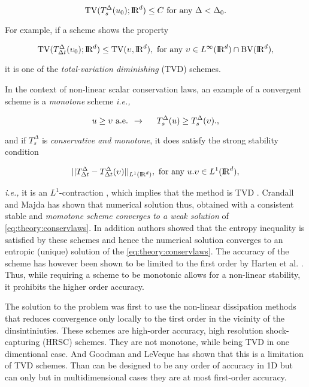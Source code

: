 \begin{equation}
\text{TV}(T_s ^{\Delta}(u_0); \text{I\!R}^d)\leq C \text{ for any } \Delta < \Delta_0.
\end{equation}

For example, if a scheme shows the property 

\begin{equation}
\text{TV}(T_{\Delta t} ^{\Delta}(\upsilon_0); \text{I\!R}^d) \leq \text{TV}(\upsilon,  \text{I\!R}^d), \text{ for any } \upsilon\in L^{\infty}(\text{I\!R}^d)\cap \text{BV}(\text{I\!R}^d),
\end{equation}

it is one of the \textit{total-variation diminishing} (TVD) schemes. 

In the context of non-linear scalar conservation laws, an example of a convergent scheme is a \textit{monotone} scheme \textit{i.e.,}

\begin{equation}
u \geq \upsilon \text{ a.e. } \rightarrow \hspace{5mm} T_{s}^{\Delta}(u) \geq T_{s}^{\Delta}(\upsilon).,
\end{equation}

and if $T_{s}^{\Delta}$ is \textit{conservative and monotone}, it does satisfy the strong stability condition 

\begin{equation}
|| T^{\Delta} _{\Delta t} - T^{\Delta} _{\Delta t}(\upsilon)||_{L^1(\text{I\!R}^d)}, \text{  for any  } u.\upsilon\in L^1(\text{I\!R}^d),
\end{equation}

\textit{i.e.,} it is an $L^1$-contraction \cite{Crandall:1980proc}, which implies that the method is TVD \cite{LeVeque:1992}. 
Crandall and Majda \cite{Crandall:1980} has shown that numerical solution thus, obtained with a consistent stable and \textit{momotone scheme converges to a weak solution} of \ref{eq:theory:conservlaws}. 
In addition authors showed that the entropy inequality is satisfied by these schemes and hence the numerical solution converges to an entropic (unique) solution of the \ref{eq:theory:conservlaws}. 
The accuracy of the scheme has however been shown to be limited to the first order by Harten et al. \cite{Harten:1976}. 
Thus, while requiring a scheme to be monotonic allows for a non-linear stability, it prohibits the higher order accuracy.

The solution to the problem was first to use the non-linear dissipation methods that reduces convergence only locally to the tirst order in the vicinity of the dinsintiniuties. 
These schemes are high-order accuracy, high resolution shock-capturing (HRSC) schemes. 
They are not monotone, while being TVD in one dimentional case. And Goodman and LeVeque \cite{Goodman:1985} has shown that this is a limitation of TVD schemes. Than can be designed to be any order of accuracy in 1D but can only but in multidimensional cases they are at most first-order accuracy. 

